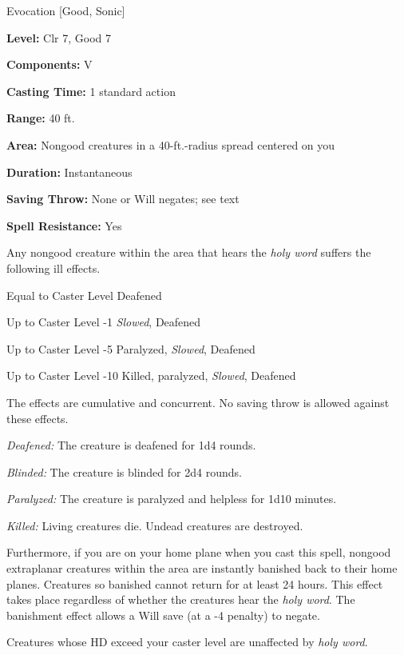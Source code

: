 
Evocation [Good, Sonic]

\textbf{Level:} Clr 7, Good 7

\textbf{Components:} V

\textbf{Casting Time:} 1 standard action

\textbf{Range:} 40 ft.

\textbf{Area:} Nongood creatures in a 40-ft.-radius spread centered on you

\textbf{Duration:} Instantaneous

\textbf{Saving Throw:} None or Will negates; see text

\textbf{Spell Resistance:} Yes

Any nongood creature within the area that hears the \textit{holy word} suffers 
the following ill effects.

\begin{description*}
\item[Equal to Caster Level] Deafened
\item[Up to Caster Level -1] \textit{Slowed}, Deafened
\item[Up to Caster Level -5] Paralyzed, \textit{Slowed}, Deafened
\item[Up to Caster Level -10] Killed, paralyzed, \textit{Slowed}, Deafened
\end{description*}

The effects are cumulative and concurrent. No saving throw is allowed against these 
effects.

\textit{Deafened:} The creature is deafened for 1d4 rounds.

\textit{Blinded:} The creature is blinded for 2d4 rounds.

\textit{Paralyzed:} The creature is paralyzed and helpless for 1d10 minutes.

\textit{Killed:} Living creatures die. Undead creatures are destroyed.

Furthermore, if you are on your home plane when you cast this spell, nongood extraplanar 
creatures within the area are instantly banished back to their home planes. Creatures 
so banished cannot return for at least 24 hours. This effect takes place regardless 
of whether the creatures hear the \textit{holy word}. The banishment effect allows 
a Will save (at a -4 penalty) to negate.

Creatures whose HD exceed your caster level are unaffected by \textit{holy word}.

